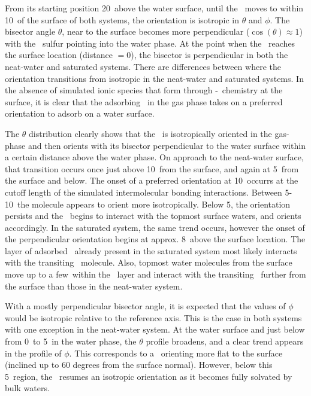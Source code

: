 	From its starting position 20\angs~above the water surface, until the \suldiox~moves to within 10\angs~of the surface of both systems, the orientation is isotropic in $\theta$ and $\phi$. The bisector angle $\theta$, near to the surface becomes more perpendicular ($\cos(\theta)\approx1$) with the \suldiox~sulfur pointing into the water phase. At the point when the \suldiox~reaches the surface location (distance $=0$\angs), the bisector is perpendicular in both the neat-water and saturated systems. There are differences between where the orientation transitions from isotropic in the neat-water and saturated systems. In the absence of simulated ionic species that form through \suldiox-\wat~chemistry at the surface, it is clear that the adsorbing \suldiox~in the gas phase takes on a preferred orientation to adsorb on a water surface.
 
  The $\theta$ distribution clearly shows that the \suldiox~is isotropically oriented in the gas-phase and then orients with its bisector perpendicular to the water surface within a certain distance above the water phase. On approach to the neat-water surface, that transition occurs once just above 10\angs~from the surface, and again at 5\angs~from the surface and below. The onset of a preferred orientation at 10\angs~occurrs at the cutoff length of the simulated intermolecular bonding interactions. Between 5-10\angs~the molecule appears to orient more isotropically. Below 5\angs, the orientation persists and the \suldiox~begins to interact with the topmost surface waters, and orients accordingly. In the saturated system, the same trend occurs, however the onset of the perpendicular orientation begins at approx. 8\angs~above the surface location. The layer of adsorbed \suldiox~already present in the saturated system most likely interacts with the transiting \suldiox~molecule. Also, topmost water molecules from the surface move up to a few\angs~within the \suldiox~layer and interact with the transiting \suldiox~further from the surface than those in the neat-water system.

  With a mostly perpendicular bisector angle, it is expected that the values of $\phi$ would be isotropic relative to the reference axis. This is the case in both systems with one exception in the neat-water system. At the water surface and just below from 0\angs~to 5\angs~in the water phase, the $\theta$ profile broadens, and a clear trend appears in the profile of $\phi$. This corresponds to a \suldiox~orienting more flat to the surface (inclined up to 60 degrees from the surface normal). However, below this 5\angs~region, the \suldiox~resumes an isotropic orientation as it becomes fully solvated by bulk waters.

